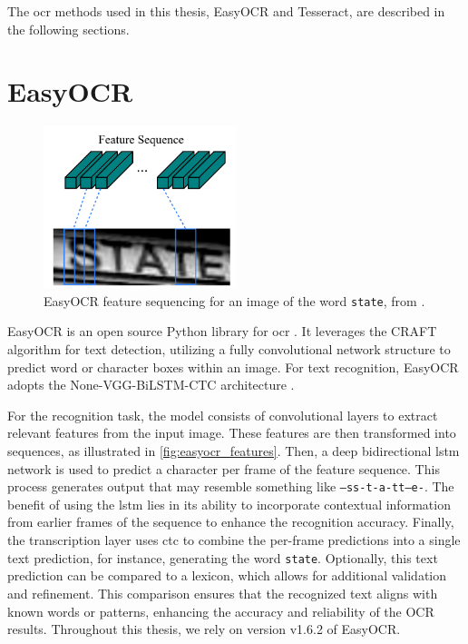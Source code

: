 The \gls{ocr} methods used in this thesis, EasyOCR and Tesseract, are described in the following sections.

\section{EasyOCR}
\label{subsec:easyocr}

\begin{figure}[h!]
    \centering
    \includegraphics[width=0.5\textwidth]{../images/external/crnn_features.png}
    \caption{EasyOCR feature sequencing for an image of the word \texttt{state}, from \cite{easyocr_2020}.}
    \label{fig:easyocr_features}
\end{figure}

EasyOCR is an open source Python library for \gls{ocr} \cite{easyocr_gitub_2020}.
It leverages the CRAFT algorithm \cite{craft_2019} for text detection, utilizing a fully convolutional network structure to predict word or character boxes within an image.
For text recognition, EasyOCR adopts the None-VGG-BiLSTM-CTC architecture \cite{crnn_2015}.

For the recognition task, the model consists of convolutional layers to extract relevant features from the input image.
These features are then transformed into sequences, as illustrated in \autoref{fig:easyocr_features}.
Then, a deep bidirectional \gls{lstm} network is used to predict a character per frame of the feature sequence.
This process generates output that may resemble something like \texttt{--ss-t-a-tt--e-}.
The benefit of using the \gls{lstm} lies in its ability to incorporate contextual information from earlier frames of the sequence to enhance the recognition accuracy.
Finally, the transcription layer uses \gls{ctc} to combine the per-frame predictions into a single text prediction, for instance, generating the word \texttt{state}.
Optionally, this text prediction can be compared to a lexicon, which allows for additional validation and refinement.
This comparison ensures that the recognized text aligns with known words or patterns, enhancing the accuracy and reliability of the OCR results.
Throughout this thesis, we rely on version v1.6.2 of EasyOCR.



